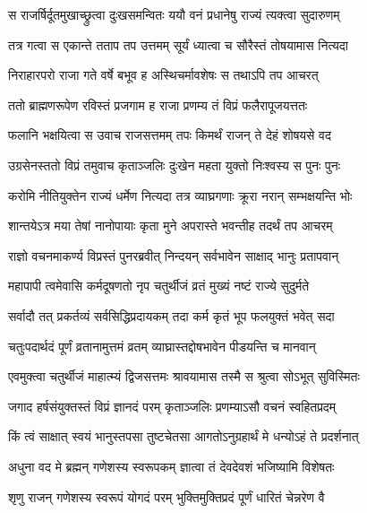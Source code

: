 \twolineshloka
{स राजर्षिर्दूतमुखाच्छ्रुत्वा दुःखसमन्वितः}
{ययौ वनं प्रधानेषु राज्यं त्यक्त्वा सुदारुणम्} %

\twolineshloka
{तत्र गत्वा स एकान्ते तताप तप उत्तमम्}
{सूर्यं ध्यात्वा च सौरैस्तं तोषयामास नित्यदा} %

\twolineshloka
{निराहारपरो राजा गते वर्षे बभूव ह}
{अस्थिचर्मावशेषः स तथाऽपि तप आचरत्} %

\twolineshloka
{ततो ब्राह्मणरूपेण रविस्तं प्रजगाम ह}
{राजा प्रणम्य तं विप्रं फलैरापूजयत्ततः} %

\twolineshloka
{फलानि भक्षयित्वा स उवाच राजसत्तमम्}
{तपः किमर्थं राजन् ते देहं शोषयसे वद} %

\twolineshloka
{उग्रसेनस्ततो विप्रं तमुवाच कृताञ्जलिः}
{दुःखेन महता युक्तो निःश्वस्य स पुनः पुनः} %


\twolineshloka
{करोमि नीतियुक्तेन राज्यं धर्मेण नित्यदा}
{तत्र व्याघ्रगणाः क्रूरा नरान् सम्भक्षयन्ति भोः} %

\twolineshloka
{शान्तयेऽत्र मया तेषां नानोपायाः कृता मुने}
{अपरास्ते भवन्तीह तदर्थं तप आचरम्} %

\twolineshloka
{राज्ञो वचनमाकर्ण्य विप्रस्तं पुनरब्रवीत्}
{निन्दयन् सर्वभावेन साक्षाद् भानुः प्रतापवान्} %


\twolineshloka
{महापापी त्वमेवासि कर्मदूषणतो नृप}
{चतुर्थीजं व्रतं मुख्यं नष्टं राज्ये सुदुर्मते} %

\twolineshloka
{सर्वादौ तत् प्रकर्तव्यं सर्वसिद्धिप्रदायकम्}
{तदा कर्म कृतं भूप फलयुक्तं भवेत् सदा} %

\twolineshloka
{चतुःपदार्थदं पूर्णं व्रतानामुत्तमं व्रतम्}
{व्याघ्रास्तद्दोषभावेन पीडयन्ति च मानवान्} %

\twolineshloka
{एवमुक्त्वा चतुर्थीजं माहात्म्यं द्विजसत्तमः}
{श्रावयामास तस्मै स श्रुत्वा सोऽभूत् सुविस्मितः} %

\twolineshloka
{जगाद हर्षसंयुक्तस्तं विप्रं ज्ञानदं परम्}
{कृताञ्जलिः प्रणम्याऽसौ वचनं स्वहितप्रदम्} %


\twolineshloka
{किं त्वं साक्षात् स्वयं भानुस्तपसा तुष्टचेतसा}
{आगतोऽनुग्रहार्थं मे धन्योऽहं ते प्रदर्शनात्} %

\twolineshloka
{अधुना वद मे ब्रह्मन् गणेशस्य स्वरूपकम्}
{ज्ञात्वा तं देवदेवशं भजिष्यामि विशेषतः} %


\twolineshloka
{श‍ृणु राजन् गणेशस्य स्वरूपं योगदं परम्}
{भुक्तिमुक्तिप्रदं पूर्णं धारितं चेन्नरेण वै} %

